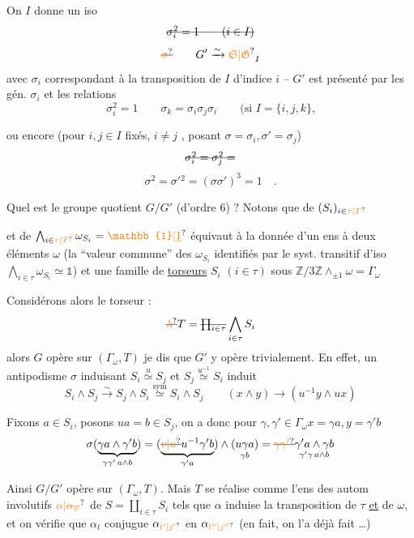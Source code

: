On   $I$ donne un iso 
\[
\deleted{\sigma_i^2=1\qquad(i\in I)}
\]
\[
\deleted{\unsure{\sigma}}\qquad G'\xrightarrow{\sim}\unsure{\mathfrak S|\mathfrak G}_I
\]
avec $\sigma_i$ correspondant à la transposition de $I$ d'indice $i$ -- $G'$ est présenté par les gén. $\sigma_i$  et les  relations
\[
\sigma_i^2=1\qquad \sigma_k=\sigma_i\sigma_j\sigma_i\qquad
\text{(si $I=\{i,j,k\}$,}
\]

ou encore (pour $i,j\in I$ fixés, $i\ne j$ , posant  $\sigma=\sigma_i,\sigma'=\sigma_j$)
\[
\deleted{\sigma_i^2=\sigma_j^2=}
\]
\[
\sigma^2=\sigma'{}^2=(\sigma\sigma')^3=1\quad.
\]

Quel est le groupe quotient $G/G'$ (d'ordre $6$) ? Notons que    de $(S_i)_{i\in\unsure{\tau|T}}$

et de $\bigwedge_{i\in\unsure{\tau|T}}\omega_{S_i}=\unsure{\mathbb{1}|\underline{1}}$ équivaut à la donnée d'un ens à deux éléments $\omega$ (la ``valeur commune'' des $\omega_{S_i}$ identifiés par le syst. transitif d'iso $\bigwedge_{i\in\tau}\omega_{S_i}\simeq\mathbb{1}$) et une famille de \uline{torseurs} $S_i$ $(i\in\tau)$ sous $\mathbb Z/3\mathbb Z\wedge_{\pm1}\omega=\Gamma_\omega$

Considérons alors le \inserted{$\Gamma_\omega$-}torseur :
\[
\deleted{\unsure{\lambda}}T=\deleted{\prod_{i\in\tau}}\bigwedge_{i\in\tau}S_i
\]
alors $G$ opère sur $(\Gamma_\omega,T)$ je dis que $G'$ y opère trivialement. En effet, un antipodisme $\sigma$ induisant $S_i\overset{u}{\simeq}S_j$ et $S_j\overset{u^{-1}}{\simeq}S_i$ induit
\[
S_i\wedge S_j\xrightarrow{\sim}S_j\wedge S_i
\overset{\mathrm{sym}}{\simeq} S_i\wedge S_j
\qquad (x\wedge y)\longrightarrow(u^{-1}y\wedge ux)
\]

 Fixons $a\in S_i$, posons $ua=b\in S_j$, on a donc pour $\gamma,\gamma'\in\Gamma_\omega$\qquad $x=\gamma a,y=\gamma'b$
\[
\sigma(\underbrace{\gamma a\wedge\gamma'b}_{\gamma\gamma'\,a\wedge b})
=(\underbrace{\deleted{\unsure{v|u}}u^{-1}\gamma'b}_{\gamma'a})\wedge
\underset{\gamma b}{(u\gamma a)}
=\deleted{\unsure{\gamma\gamma'}}\underset{\gamma'\gamma\,a\wedge b}{\gamma'a\wedge\gamma b}
\]

Ainsi $G/G'$ opère sur $(\Gamma_\omega,T)$. Mais $T$ se réalise  comme l'ens des  autom involutifs $\unsure{\alpha|\deleted{\alpha_\psi}}$ de $S=\coprod_{i\in\tau}S_i$ tels que $\alpha$ induise la transposition de $\tau$ \uline{et} de $\omega$, et on vérifie que $\alpha_t$ conjugue $\alpha_{\unsure{t'|j'}}$ en $\alpha_{\unsure{t''|j''}}$ (en fait, on l'a déjà fait \ldots)

